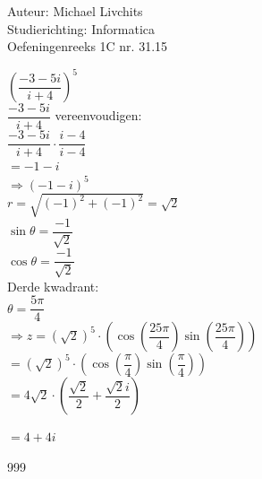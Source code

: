 \documentclass[a4paper]{article}
\begin{document}
  
\noindent \large Auteur: Michael Livchits \\
\noindent \large Studierichting: Informatica\\
\noindent \large Oefeningenreeks 1C nr. 31.15\\

\medskip

\normalsize

$\left(\dfrac{-3-5i}{i+4}\right)^5$\\

$\dfrac{-3-5i}{i+4}$  vereenvoudigen: \\

$\dfrac{-3-5i}{i+4} \cdot \dfrac{i-4}{i-4}$ \\

$= -1-i$\\

$\Rightarrow (-1-i)^5$\\

$r = \sqrt{(-1)^2 + (-1)^2} = \sqrt{2}$\\

$\sin\theta = \dfrac{-1}{\sqrt{2}}$\\

$\cos\theta = \dfrac{-1}{\sqrt{2}}$\\

Derde kwadrant:\\

$\theta = \dfrac{5\pi}{4}$\\

$\Rightarrow z = \left(\sqrt{2}\right)^{5}\cdot\left(\cos\left(\dfrac{25\pi}{4}\right)\sin\left(\dfrac{25\pi}{4}\right) \right)$\\

$ = \left(\sqrt{2}\right)^{5}\cdot\left(\cos\left(\dfrac{\pi}{4}\right)\sin\left(\dfrac{\pi}{4}\right) \right)$\\

$ = 4\sqrt{2}\cdot\left(\dfrac{\sqrt{2}}{2}+\dfrac{\sqrt{2}i}{2}\right)$

$= 4+4i$\\

\begin{thebibliography}{999}
\end{thebibliography}
\end{document}
